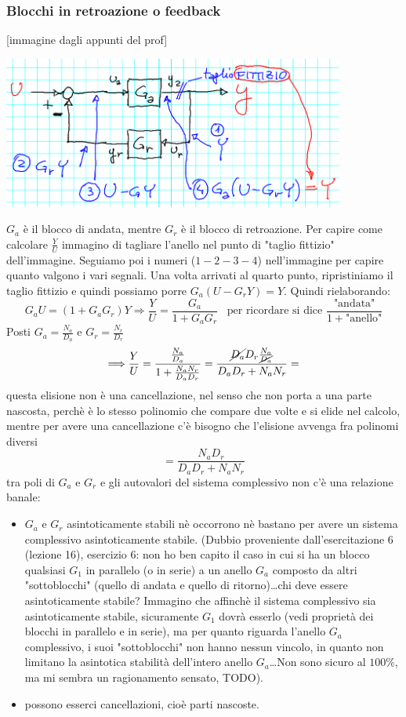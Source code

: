 \subsubsection{Blocchi in retroazione o feedback}
[immagine dagli appunti del prof]
\begin{center}
    \includegraphics[height=5cm]{../lezione11/img5.PNG}
\end{center}
$G_a$ è il blocco di andata, mentre $G_r$ è il blocco di retroazione.\newline
Per capire come calcolare $\frac{Y}{U}$ immagino di tagliare l'anello nel punto di "taglio fittizio" dell'immagine. Seguiamo poi i numeri ($1-2-3-4$) nell'immagine per capire quanto valgono i vari segnali. Una volta arrivati al quarto punto, ripristiniamo il taglio fittizio e quindi possiamo porre $G_a(U-G_r Y) = Y$. Quindi rielaborando:
\[
    G_a U = (1+G_aG_r)Y \Longrightarrow \frac{Y}{U} = \frac{G_a}{1 + G_a G_r} \;\;\;\text{per ricordare si dice $\frac{\text{"andata"}}{1+ \text{"anello"}}$}
\]
Posti $G_a = \frac{N_a}{D_a}$ e $G_r = \frac{N_r}{D_r}$
\[
    \Longrightarrow \frac{Y}{U} = \frac{\frac{N_a}{D_a}}{1 + \frac{N_aN_r}{D_aD_r}} = \frac{\cancel{D_a}D_r \frac{N_a}{\cancel{D_a}}}{D_aD_r + N_aN_r}=
\]
questa elisione non è una cancellazione, nel senso che non porta a una parte nascosta, perchè è lo stesso polinomio che compare due volte e si elide nel calcolo, mentre per avere una cancellazione c'è bisogno che l'elisione avvenga fra polinomi diversi
\[
    = \frac{N_aD_r}{D_aD_r +N_aN_r}
\]
tra poli di $G_a$ e $G_r$ e gli autovalori del sistema complessivo non c'è una relazione banale:
\begin{itemize}
    \item $G_a$ e $G_r$ asintoticamente stabili nè occorrono nè bastano per avere un sistema complessivo asintoticamente stabile. (Dubbio proveniente dall'esercitazione 6 (lezione 16), esercizio 6: non ho ben capito il caso in cui si ha un blocco qualsiasi $G_1$ in parallelo (o in serie) a un anello $G_a$ composto da altri "sottoblocchi" (quello di andata e quello di ritorno)\dots chi deve essere asintoticamente stabile? Immagino che affinchè il sistema complessivo sia asintoticamente stabile, sicuramente $G_1$ dovrà esserlo (vedi proprietà dei blocchi in parallelo e in serie), ma per quanto riguarda l'anello $G_a$ complessivo, i suoi "sottoblocchi" non hanno nessun vincolo, in quanto non limitano la asintotica stabilità dell'intero anello $G_a$\dots Non sono sicuro al $100\%$, ma mi sembra un ragionamento sensato, TODO).
    \item possono esserci cancellazioni, cioè parti nascoste.
\end{itemize}
